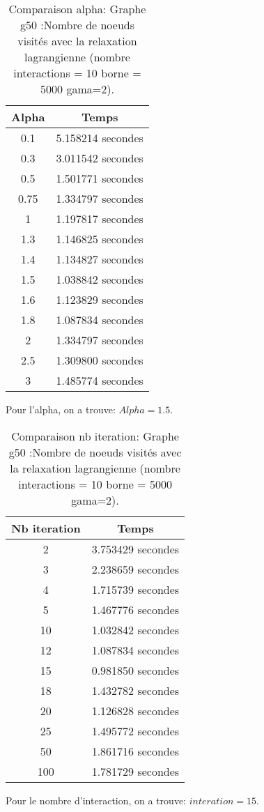 \documentclass[a4paper,11pt]{article}
\begin{document}
\begin{table}[h!]
\begin{centering}
\begin{tabular}{|c|c|}
\hline 
Alpha & Temps\tabularnewline
\hline 
\hline 
0.1 & 5.158214 secondes\tabularnewline
\hline 
0.3 & 3.011542 secondes\tabularnewline
\hline 
0.5 & 1.501771 secondes\tabularnewline
\hline 
0.75 & 1.334797 secondes\tabularnewline
\hline 
1 & 1.197817 secondes\tabularnewline
\hline 
1.3 & 1.146825 secondes\tabularnewline
\hline 
1.4 & 1.134827 secondes\tabularnewline
\hline 
1.5 & 1.038842 secondes\tabularnewline
\hline 
1.6 & 1.123829 secondes\tabularnewline
\hline 
1.8 & 1.087834 secondes\tabularnewline
\hline 
2 & 1.334797 secondes\tabularnewline
\hline 
2.5 & 1.309800 secondes\tabularnewline
\hline 
3 & 1.485774 secondes\tabularnewline
\hline 
\end{tabular}
\par\end{centering}

\caption{Comparaison alpha: Graphe g50 :Nombre de noeuds visités avec la relaxation
lagrangienne (nombre interactions = 10 borne = 5000 gama=2). }
\end{table}

Pour l'alpha, on a trouve: $Alpha = 1.5$.

\begin{table}[h!]
\begin{centering}
\begin{tabular}{|c|c|}
\hline 
Nb iteration & Temps\tabularnewline
\hline 
\hline 
2 & 3.753429 secondes\tabularnewline
\hline 
3 & 2.238659 secondes\tabularnewline
\hline 
4 & 1.715739 secondes \tabularnewline
\hline 
5 & 1.467776 secondes\tabularnewline
\hline 
10 & 1.032842 secondes\tabularnewline
\hline 
12 & 1.087834 secondes\tabularnewline
\hline 
15 & 0.981850 secondes\tabularnewline
\hline 
18 & 1.432782 secondes \tabularnewline
\hline 
20 & 1.126828 secondes\tabularnewline
\hline 
25 & 1.495772 secondes\tabularnewline
\hline 
50 & 1.861716 secondes\tabularnewline
\hline 
100 & 1.781729 secondes\tabularnewline
\hline 
\end{tabular}
\par\end{centering}

\caption{Comparaison nb iteration: Graphe g50 :Nombre de noeuds visités avec
la relaxation lagrangienne (nombre interactions = 10 borne = 5000
gama=2). }
\end{table}


Pour le nombre d'interaction, on a trouve: $interation = 15$.
\end{document}
